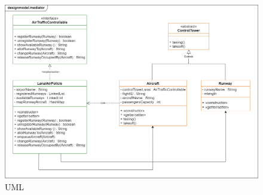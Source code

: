 \documentclass{article}
\begin{document}
\begin{sloppy}
\bigbreak
\begin{figure}[H]
    \centering
    \includegraphics[scale=0.275]{figure7.png}
    \caption{UML}
    \label{fig:enter-label}
\end{figure}
\bigbreak



\end{sloppy}
\end{document}
